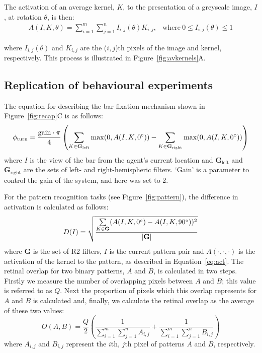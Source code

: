 The activation of an average kernel, $K$, to the presentation of a greyscale image, $I$, at rotation $\theta$, is then:
\begin{equation}
\label{eq:act}
\begin{array}{rl}
A(I,K,\theta) = {\sum\limits^m_{i=1} \sum\limits^n_{j=1} I_{i,j}(\theta)K_{i,j}}, &\mathrm{where\ } 0 \le I_{i,j}(\theta) \le 1
\end{array}
\end{equation}

where $I_{i,j}(\theta)$ and $K_{i,j}$ are the ($i,j$)th pixels of the image and kernel, respectively. This process is illustrated in Figure~\ref{fig:avkernels}A.

\subsection*{Replication of behavioural experiments}
\label{sec:methods:replication}
The equation for describing the bar fixation mechanism shown in Figure~\ref{fig:recap}C is as follows:
$$
\phi_\mathrm{turn} = \frac{\mathrm{gain}\cdot \pi}{4}\left( \sum\limits_{K\in \mathbf{G}_\mathrm{left}}\max(0,A(I,K,0\degree)) - \sum\limits_{K\in \mathbf{G}_\mathrm{right}}\max(0,A(I,K,0\degree)) \right)
$$
where $I$ is the view of the bar from the agent's current location and $\mathbf{G}_\mathrm{left}$ and $\mathbf{G}_\mathrm{right}$ are the sets of left- and right-hemispheric filters. `Gain' is a parameter to control the gain of the system, and here was set to 2.

For the pattern recognition tasks (see Figure~\ref{fig:pattern}), the difference in activation is calculated as follows:
$$
D(I) = \sqrt{\frac{\sum\limits_{K\in \mathbf{G}}(A(I,K,0\degree)-A(I,K,90\degree))^2}{|\mathbf{G}|}}
$$
where $\mathbf{G}$ is the set of R2 filters, $I$ is the current pattern pair and $A(\cdot,\cdot,\cdot)$ is the activation of the kernel to the pattern, as described in Equation~\ref{eq:act}.
The retinal overlap for two binary patterns, $A$ and $B$, is calculated in two steps. Firstly we measure the number of overlapping pixels between $A$ and $B$; this value is referred to as $Q$. Next the proportion of pixels which this overlap represents for $A$ and $B$ is calculated and, finally, we calculate the retinal overlap as the average of these two values:
$$
O(A,B) = \frac{Q}{2} \left( \frac{1}{\sum\limits_{i=1}^m \sum\limits_{j=1}^n A_{i,j}} + \frac{1}{\sum\limits_{i=1}^m \sum\limits_{j=1}^n B_{i,j}} \right)
$$
where $A_{i,j}$ and $B_{i,j}$ represent the $i$th, $j$th pixel of patterns $A$ and $B$, respectively.

